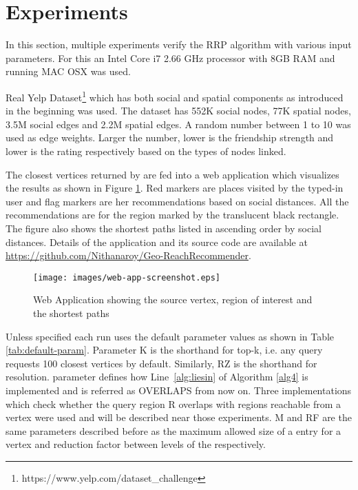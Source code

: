 \section{Experiments} \label{sec:experiment}

In this section, multiple experiments verify the RRP algorithm with various input parameters. For this an Intel Core i7 2.66 GHz processor with 8GB RAM and running MAC OSX was used. 

Real Yelp Dataset\footnote{https://www.yelp.com/dataset\_challenge} which has both social and spatial components as introduced in the beginning was used. The dataset has 552K social nodes, 77K spatial nodes, 3.5M social edges and 2.2M spatial edges. A random number between 1 to 10 was used as edge weights. Larger the number, lower is the friendship strength and lower is the rating respectively based on the types of nodes linked. 

The closest vertices returned by {\rrp} are fed into a web application which visualizes the results as shown in Figure \ref{fig:web-app}. Red markers are places visited by the typed-in user and flag markers are her recommendations based on social distances. All the recommendations are for the region marked by the translucent black rectangle. The figure also shows the shortest paths listed in ascending order by social distances. Details of the application and its source code are available at \href{https://github.com/Nithanaroy/GeoReachRecommender}{https://github.com/Nithanaroy/Geo-ReachRecommender}.

\begin{figure}[t]
	\centering \texttt{[image: images/web-app-screenshot.eps]}
    \caption{Web Application showing the source vertex, region of interest and the shortest paths}
    \label{fig:web-app}
\end{figure}

Unless specified each run uses the default parameter values as shown in Table \ref{tab:default-param}. Parameter K is the shorthand for top-k, i.e. any query requests 100 closest vertices by default. Similarly, RZ is the shorthand for resolution. \textit{{\vra}} parameter defines how Line~\ref{alg:liesin} of Algorithm \ref{alg4} is implemented and is referred as OVERLAPS from now on. Three implementations which check whether the query region R overlaps with regions reachable from a vertex were used and will be described near those experiments. M and RF are the same parameters described before as the maximum allowed size of a {\rrpspatial} entry for a vertex and reduction factor between levels of the {\rrpspatial} respectively.

